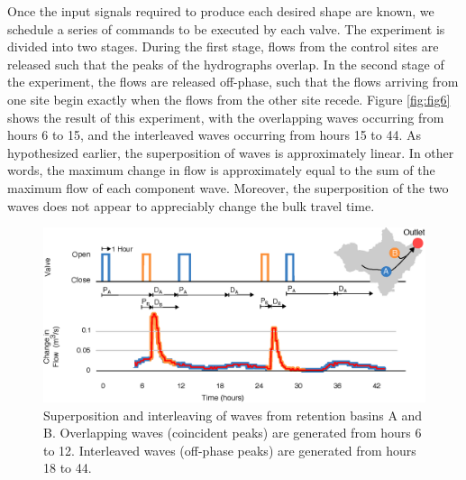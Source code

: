 Once the input signals required to produce each desired shape are known, we schedule a series of commands to be executed by each valve. The experiment is divided into two stages.
During the first stage, flows from the control sites are released such that the peaks of the hydrographs overlap.
In the second stage of the experiment, the flows are released off-phase, such that the flows arriving from one site begin exactly when the flows from the other site recede.
Figure \ref{fig:fig6} shows the result of this experiment, with the overlapping waves occurring from hours 6 to 15, and the interleaved waves occurring from hours 15 to 44. As hypothesized earlier, the superposition of waves is approximately linear. In other words, the maximum change in flow is approximately equal to the sum of the maximum flow of each component wave. Moreover, the superposition of the two waves does not appear to appreciably change the bulk travel time.


\begin{figure}
    \centering
    \includegraphics[width=\textwidth]{gfx/Chapter-2/Figure6.eps}
    \caption{Superposition and interleaving of waves from retention basins A and B.
    Overlapping waves (coincident peaks) are generated from hours 6 to 12. Interleaved waves (off-phase peaks) are generated from hours 18 to 44.
    }
    \label{fig:ch2-fig6}
\end{figure}


